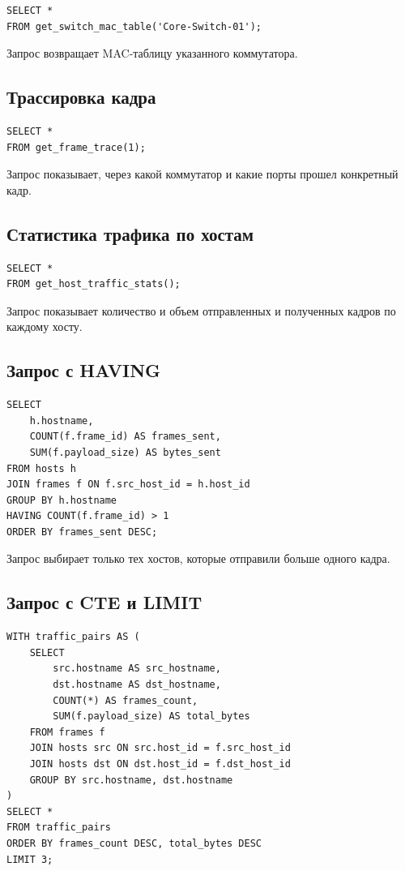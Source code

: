 \documentclass[12pt,a4paper]{article}
\begin{document}
\begin{lstlisting}
SELECT *
FROM get_switch_mac_table('Core-Switch-01');
\end{lstlisting}

Запрос возвращает MAC-таблицу указанного коммутатора.

\subsection{Трассировка кадра}

\begin{lstlisting}
SELECT *
FROM get_frame_trace(1);
\end{lstlisting}

Запрос показывает, через какой коммутатор и какие порты прошел конкретный кадр.

\subsection{Статистика трафика по хостам}

\begin{lstlisting}
SELECT *
FROM get_host_traffic_stats();
\end{lstlisting}

Запрос показывает количество и объем отправленных и полученных кадров по каждому хосту.

\subsection{Запрос с HAVING}

\begin{lstlisting}
SELECT
    h.hostname,
    COUNT(f.frame_id) AS frames_sent,
    SUM(f.payload_size) AS bytes_sent
FROM hosts h
JOIN frames f ON f.src_host_id = h.host_id
GROUP BY h.hostname
HAVING COUNT(f.frame_id) > 1
ORDER BY frames_sent DESC;
\end{lstlisting}

Запрос выбирает только тех хостов, которые отправили больше одного кадра.

\subsection{Запрос с CTE и LIMIT}

\begin{lstlisting}
WITH traffic_pairs AS (
    SELECT
        src.hostname AS src_hostname,
        dst.hostname AS dst_hostname,
        COUNT(*) AS frames_count,
        SUM(f.payload_size) AS total_bytes
    FROM frames f
    JOIN hosts src ON src.host_id = f.src_host_id
    JOIN hosts dst ON dst.host_id = f.dst_host_id
    GROUP BY src.hostname, dst.hostname
)
SELECT *
FROM traffic_pairs
ORDER BY frames_count DESC, total_bytes DESC
LIMIT 3;
\end{lstlisting}
\end{document}

